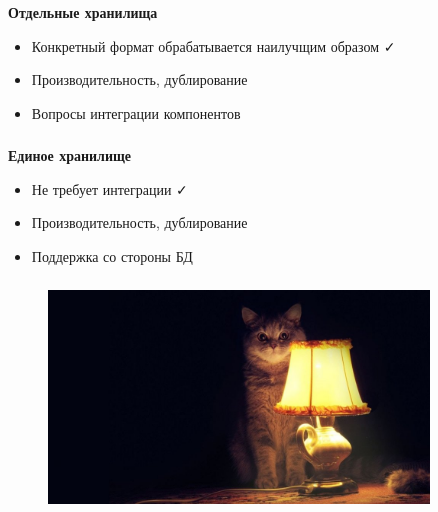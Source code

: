 \documentclass[18pt, compress, aspectratio=169]{beamer}
\def\check{\textcolor{check}{\FA \faCheck}}
\def\fail{\textcolor{fail}{\FA \faRemove}}
\def\question{\textcolor{question}{\FA \faSearch}}
\begin{document}
\begin{frame}
    \frametitle{}
    \begin{center}
        \textbf{Отдельные хранилища}
        \pause
        \begin{itemize}[label={\MVRightarrow}]
            \item <+-> Конкретный формат обрабатывается наилучщим образом \check
            \item <+-> Производительность, дублирование \question
            \item <+-> Вопросы интеграции компонентов \fail
        \end{itemize}
    \end{center}
\end{frame}

\begin{frame}
    \frametitle{}
    \begin{center}
        \textbf{Единое хранилище}
        \pause
        \begin{itemize}[label={\MVRightarrow}]
            \item <+-> Не требует интеграции \check
            \item <+-> Производительность, дублирование \question
            \item <+-> Поддержка со стороны БД \question
        \end{itemize}
    \end{center}
\end{frame}

\begin{frame}
    \frametitle{}
    \begin{center}
    \begin{figure}
        \includegraphics[width=0.9\textwidth,center]{cat_stories.jpg}
    \end{figure}
    \end{center}
\end{frame}
\end{document}
